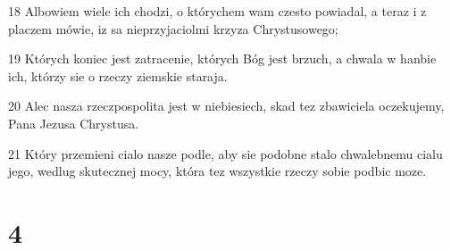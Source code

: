 \par 18 Albowiem wiele ich chodzi, o którychem wam czesto powiadal, a teraz i z placzem mówie, iz sa nieprzyjaciolmi krzyza Chrystusowego;
\par 19 Których koniec jest zatracenie, których Bóg jest brzuch, a chwala w hanbie ich, którzy sie o rzeczy ziemskie staraja.
\par 20 Alec nasza rzeczpospolita jest w niebiesiech, skad tez zbawiciela oczekujemy, Pana Jezusa Chrystusa.
\par 21 Który przemieni cialo nasze podle, aby sie podobne stalo chwalebnemu cialu jego, wedlug skutecznej mocy, która tez wszystkie rzeczy sobie podbic moze.

\chapter{4}

